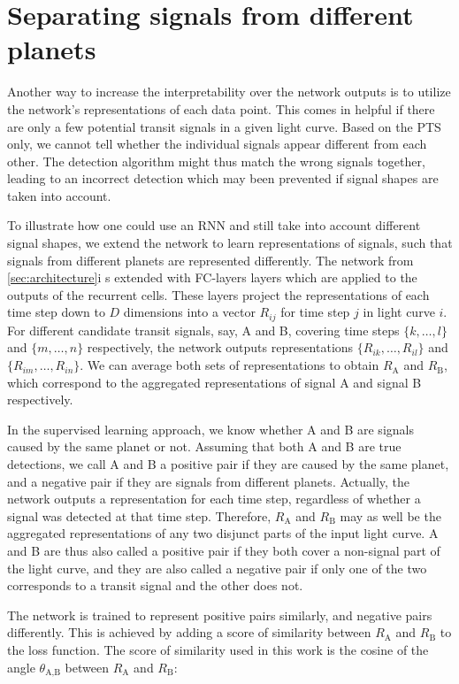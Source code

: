 
\section{Separating signals from different planets}
\label{sec:rnn_repr}


Another way to increase the interpretability over the network outputs is to utilize the network's representations of each data point. This comes in helpful if there are only a few potential transit signals in a given light curve. Based on the PTS only, we cannot tell whether the individual signals appear different from each other. The detection algorithm might thus match the wrong signals together, leading to an incorrect detection which may been prevented if signal shapes are taken into account. 

To illustrate how one could use an RNN and still take into account different signal shapes, we extend the network to learn representations of signals, such that signals from different planets are represented differently. The network from \ref{sec:architecture}i s extended with FC-layers layers which are applied to the outputs of the recurrent cells. These layers project the representations of each time step down to $D$ dimensions into a vector $R_{ij}$ for time step $j$ in light curve $i$. For different candidate transit signals, say, A and B, covering time steps $\{k,\dots,l\}$ and $\{m,\dots,n\}$ respectively, the network outputs representations $\{R_{ik},\dots,R_{il}\}$ and $\{R_{im},\dots,R_{in}\}$. We can average both sets of representations to obtain $R_\text{A}$ and $R_\text{B}$, which correspond to the aggregated representations of signal A and signal B respectively. 

In the supervised learning approach, we know whether A and B are signals caused by the same planet or not. Assuming that both A and B are true detections, we call A and B a positive pair if they are caused by the same planet, and a negative pair if they are signals from different planets. Actually, the network outputs a representation for each time step, regardless of whether a signal was detected at that time step. Therefore, $R_\text{A}$ and $R_\text{B}$ may as well be the aggregated representations of any two disjunct parts of the input light curve. A and B are thus also called a positive pair if they both cover a non-signal part of the light curve, and they are also called a negative pair if only one of the two corresponds to a transit signal and the other does not.


The network is trained to represent positive pairs similarly, and negative pairs differently. This is achieved by adding a score of similarity between $R_\text{A}$ and $R_\text{B}$ to the loss function. The score of similarity used in this work is the cosine of the angle $\theta_{\text{A}, \text{B}}$ between $R_\text{A}$ and $R_\text{B}$:

